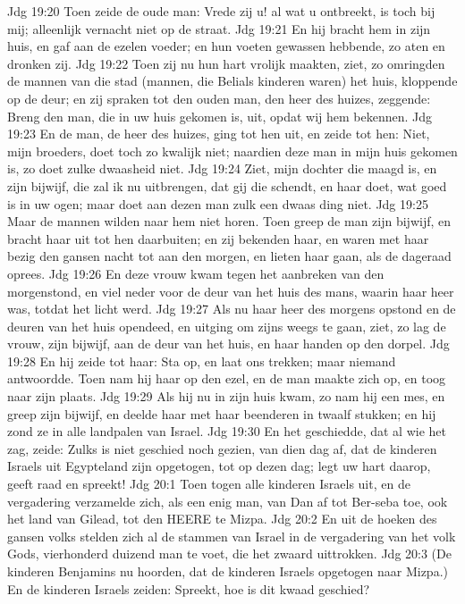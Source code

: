 Jdg 19:20  Toen zeide de oude man: Vrede zij u! al wat u ontbreekt, is toch bij mij; alleenlijk vernacht niet op de straat.
Jdg 19:21  En hij bracht hem in zijn huis, en gaf aan de ezelen voeder; en hun voeten gewassen hebbende, zo aten en dronken zij.
Jdg 19:22  Toen zij nu hun hart vrolijk maakten, ziet, zo omringden de mannen van die stad (mannen, die Belials kinderen waren) het huis, kloppende op de deur; en zij spraken tot den ouden man, den heer des huizes, zeggende: Breng den man, die in uw huis gekomen is, uit, opdat wij hem bekennen.
Jdg 19:23  En de man, de heer des huizes, ging tot hen uit, en zeide tot hen: Niet, mijn broeders, doet toch zo kwalijk niet; naardien deze man in mijn huis gekomen is, zo doet zulke dwaasheid niet.
Jdg 19:24  Ziet, mijn dochter die maagd is, en zijn bijwijf, die zal ik nu uitbrengen, dat gij die schendt, en haar doet, wat goed is in uw ogen; maar doet aan dezen man zulk een dwaas ding niet.
Jdg 19:25  Maar de mannen wilden naar hem niet horen. Toen greep de man zijn bijwijf, en bracht haar uit tot hen daarbuiten; en zij bekenden haar, en waren met haar bezig den gansen nacht tot aan den morgen, en lieten haar gaan, als de dageraad oprees.
Jdg 19:26  En deze vrouw kwam tegen het aanbreken van den morgenstond, en viel neder voor de deur van het huis des mans, waarin haar heer was, totdat het licht werd.
Jdg 19:27  Als nu haar heer des morgens opstond en de deuren van het huis opendeed, en uitging om zijns weegs te gaan, ziet, zo lag de vrouw, zijn bijwijf, aan de deur van het huis, en haar handen op den dorpel.
Jdg 19:28  En hij zeide tot haar: Sta op, en laat ons trekken; maar niemand antwoordde. Toen nam hij haar op den ezel, en de man maakte zich op, en toog naar zijn plaats.
Jdg 19:29  Als hij nu in zijn huis kwam, zo nam hij een mes, en greep zijn bijwijf, en deelde haar met haar beenderen in twaalf stukken; en hij zond ze in alle landpalen van Israel.
Jdg 19:30  En het geschiedde, dat al wie het zag, zeide: Zulks is niet geschied noch gezien, van dien dag af, dat de kinderen Israels uit Egypteland zijn opgetogen, tot op dezen dag; legt uw hart daarop, geeft raad en spreekt!
Jdg 20:1  Toen togen alle kinderen Israels uit, en de vergadering verzamelde zich, als een enig man, van Dan af tot Ber-seba toe, ook het land van Gilead, tot den HEERE te Mizpa.
Jdg 20:2  En uit de hoeken des gansen volks stelden zich al de stammen van Israel in de vergadering van het volk Gods, vierhonderd duizend man te voet, die het zwaard uittrokken.
Jdg 20:3  (De kinderen Benjamins nu hoorden, dat de kinderen Israels opgetogen naar Mizpa.) En de kinderen Israels zeiden: Spreekt, hoe is dit kwaad geschied?
